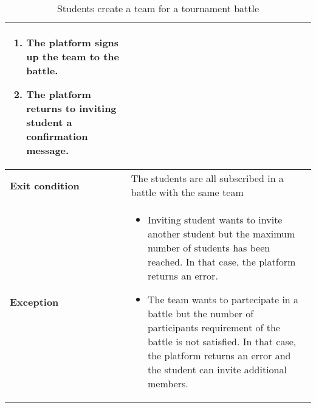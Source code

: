 \begin{enumerate}[label=\textbf{UC\arabic*}:,ref=UC\arabic*,leftmargin=1.3cm]
{\begin{table}[H]
\begin{tabular}{|l|p{11.9cm}|}
\begin{enumerate}[label=\arabic*.]
                              \item The platform signs up the team to the battle.
                              \item The platform returns to inviting student a confirmation message.
                        \end{enumerate}          \\\hline
                        \textbf{Exit condition}  & The students are all subscribed in a battle with the same team                                                            \\\hline
                        \textbf{Exception}       & \begin{itemize}
                                                         \item Inviting student wants to invite another student but the maximum number of students has been reached.
                                                               In that case, the platform returns an error.
                                                         \item The team wants to partecipate in a battle but the number of participants requirement of the battle is not satisfied.
                                                               In that case, the platform returns an error and the student can invite additional members.
                                                   \end{itemize} \\\hline
                  \end{tabular}
                  \caption{Students create a team for a tournament battle}
                  \label{table:Students create a team for a tournament battle}
            \end{table}
            \pagebreak
            \begin{adjustbox}{
                        max size={\textwidth}{},
                        caption={Students create a team for a tournament battle},
                        label={fig:Students create a team for a tournament battle},
                        figure=H}
                  \centering
            \end{adjustbox}
            \pagebreak
      }
\end{enumerate}
